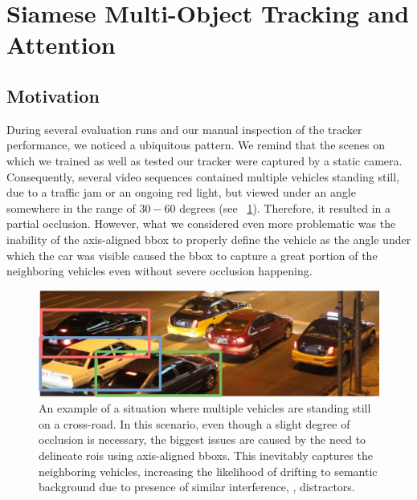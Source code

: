 \section{Siamese Multi-Object Tracking and Attention}
\label{sec:SiamMOTandAttention}

\subsection{Motivation}

During several evaluation runs and our manual inspection of the tracker performance, we noticed a ubiquitous pattern. We remind that the scenes on which we trained as well as tested our tracker were captured by a static camera. Consequently, several video sequences contained multiple vehicles standing still, due to a traffic jam or an ongoing red light, but viewed under an angle somewhere in the range of $30-60$ degrees (see
\figtext{}~\ref{fig:UADETRACPartialOcclusion}). Therefore, it resulted in a partial occlusion. However, what we considered even more problematic was the inability of the axis-aligned \gls{bbox} to properly define the vehicle as the angle under which the car was visible caused the \gls{bbox} to capture a great portion of the neighboring vehicles even without severe occlusion happening.

\begin{figure}[!t]
    \centerline{\includegraphics[width=0.7\linewidth]{figures/siamese_tracking/uadetrac_partial_occlusion_red_light.pdf}}
    \caption[Partial occlusion in the \uadetrac{} dataset]{An example of a situation where multiple vehicles are standing still on a cross-road. In this scenario, even though a slight degree of occlusion is necessary, the biggest issues are caused by the need to delineate \glspl{roi} using axis-aligned \glspl{bbox}. This inevitably captures the neighboring vehicles, increasing the likelihood of drifting to semantic background due to presence of similar interference, \ietext{}, distractors.}
    \label{fig:UADETRACPartialOcclusion}
\end{figure}

